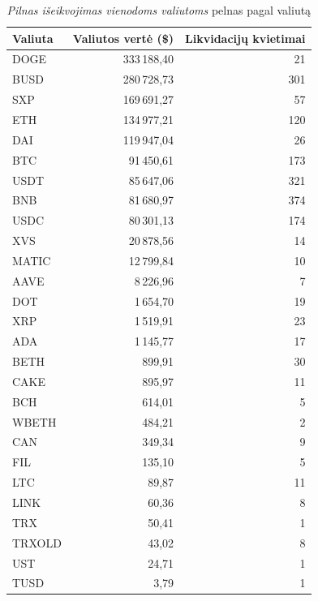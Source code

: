 \documentclass[]{VUMIFTemplateClass}
\begin{document}
\begin{table}[H]
\centering
\caption{\textit{Pilnas išeikvojimas vienodoms valiutoms} pelnas pagal valiutą}
\label{tab:liq_same_tokens_profit}
\begin{tabular}{|l|r|r|}
\hline
\textbf{Valiuta} & \textbf{Valiutos vertė (\$)} & \textbf{Likvidacijų kvietimai} \\
\hline
DOGE  & 333\,188,40  & 21 \\
BUSD  & 280\,728,73  & 301 \\
SXP   & 169\,691,27  & 57 \\
ETH   & 134\,977,21  & 120 \\
DAI   & 119\,947,04  & 26 \\
BTC   & 91\,450,61   & 173 \\
USDT  & 85\,647,06   & 321 \\
BNB   & 81\,680,97   & 374 \\
USDC  & 80\,301,13   & 174 \\
XVS   & 20\,878,56   & 14 \\
MATIC & 12\,799,84   & 10 \\
AAVE  & 8\,226,96    & 7 \\
DOT   & 1\,654,70    & 19 \\
XRP   & 1\,519,91    & 23 \\
ADA   & 1\,145,77    & 17 \\
BETH  & 899,91     & 30 \\
CAKE  & 895,97     & 11 \\
BCH   & 614,01     & 5 \\
WBETH & 484,21     & 2 \\
CAN   & 349,34     & 9 \\
FIL   & 135,10     & 5 \\
LTC   & 89,87      & 11 \\
LINK  & 60,36      & 8 \\
TRX   & 50,41      & 1 \\
TRXOLD & 43,02     & 8 \\
UST   & 24,71      & 1 \\
TUSD  & 3,79       & 1 \\
\hline
\end{tabular}
\end{table}

\end{document}
